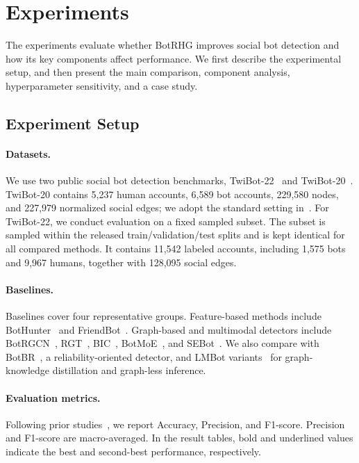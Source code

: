 \section{Experiments}\label{sec:experiments}

The experiments evaluate whether BotRHG improves social bot detection and how its key components affect performance. We first describe the experimental setup, and then present the main comparison, component analysis, hyperparameter sensitivity, and a case study.

\subsection{Experiment Setup}

\paragraph{Datasets.}
We use two public social bot detection benchmarks, TwiBot-22~\cite{twibot22benchmark} and TwiBot-20~\cite{feng2021twibot20}. TwiBot-20 contains 5,237 human accounts, 6,589 bot accounts, 229,580 nodes, and 227,979 normalized social edges; we adopt the standard setting in~\cite{feng2021twibot20}. For TwiBot-22, we conduct evaluation on a fixed sampled subset. The subset is sampled within the released train/validation/test splits and is kept identical for all compared methods. It contains 11,542 labeled accounts, including 1,575 bots and 9,967 humans, together with 128,095 social edges.

\paragraph{Baselines.}
Baselines cover four representative groups. Feature-based methods include BotHunter~\cite{bot_hunter2018} and FriendBot~\cite{friendbot2020}. Graph-based and multimodal detectors include BotRGCN~\cite{feng2021botrgcn}, RGT~\cite{feng2022rgt}, BIC~\cite{lei2023bic}, BotMoE~\cite{liu2023botmoe}, and SEBot~\cite{yang2024sebot}. We also compare with BotBR~\cite{lin2025botbr}, a reliability-oriented detector, and LMBot variants~\cite{cai2024lmbot} for graph-knowledge distillation and graph-less inference.

\paragraph{Evaluation metrics.}
Following prior studies~\cite{feng2022rgt,yang2024sebot,gao2025higherorder}, we report Accuracy, Precision, and F1-score. Precision and F1-score are macro-averaged. In the result tables, bold and underlined values indicate the best and second-best performance, respectively.

